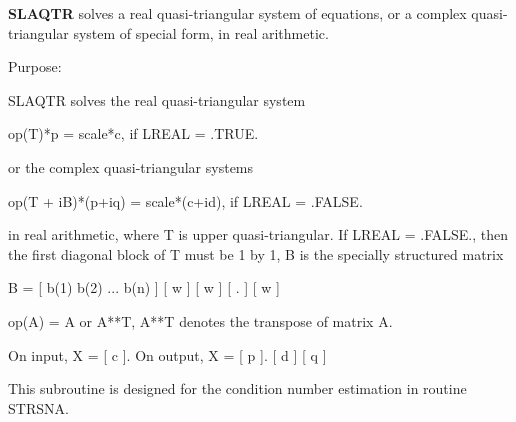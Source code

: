 {\bfseries S\+L\+A\+Q\+T\+R} solves a real quasi-\/triangular system of equations, or a complex quasi-\/triangular system of special form, in real arithmetic. 

 \begin{DoxyParagraph}{Purpose\+: }
\begin{DoxyVerb} SLAQTR solves the real quasi-triangular system

              op(T)*p = scale*c,               if LREAL = .TRUE.

 or the complex quasi-triangular systems

            op(T + iB)*(p+iq) = scale*(c+id),  if LREAL = .FALSE.

 in real arithmetic, where T is upper quasi-triangular.
 If LREAL = .FALSE., then the first diagonal block of T must be
 1 by 1, B is the specially structured matrix

                B = [ b(1) b(2) ... b(n) ]
                    [       w            ]
                    [           w        ]
                    [              .     ]
                    [                 w  ]

 op(A) = A or A**T, A**T denotes the transpose of
 matrix A.

 On input, X = [ c ].  On output, X = [ p ].
               [ d ]                  [ q ]

 This subroutine is designed for the condition number estimation
 in routine STRSNA.\end{DoxyVerb}
 
\end{DoxyParagraph}

